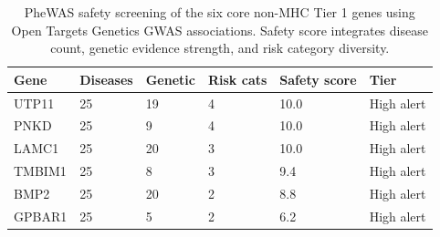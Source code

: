\begin{table}[htbp]
\centering
\caption{PheWAS safety screening of the six core non-MHC Tier 1 genes using Open Targets Genetics GWAS associations. Safety score integrates disease count, genetic evidence strength, and risk category diversity.}\label{tab:phewas_safety}
\small
\begin{tabular}{llllll}
\toprule
  Gene & Diseases & Genetic & Risk cats & Safety score & Tier \\
\midrule
  UTP11 & 25 & 19 & 4 & 10.0 & High alert \\
  PNKD & 25 & 9 & 4 & 10.0 & High alert \\
  LAMC1 & 25 & 20 & 3 & 10.0 & High alert \\
  TMBIM1 & 25 & 8 & 3 & 9.4 & High alert \\
  BMP2 & 25 & 20 & 2 & 8.8 & High alert \\
  GPBAR1 & 25 & 5 & 2 & 6.2 & High alert \\
\bottomrule
\end{tabular}
\end{table}

